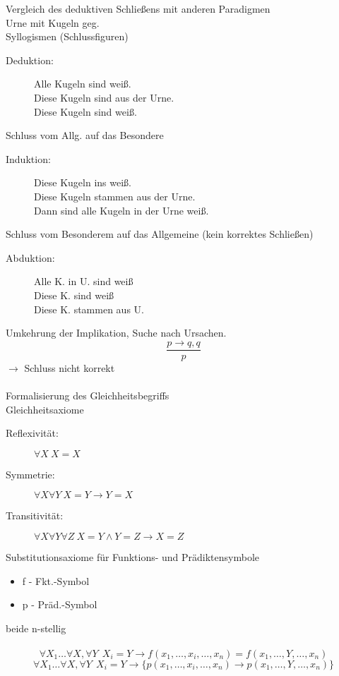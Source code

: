 \documentclass[a4paper,14pt]{article}
\begin{document}
Vergleich des deduktiven Schließens mit anderen Paradigmen\\
Urne mit Kugeln geg.\\
Syllogismen (Schlussfiguren)\\
\begin{description}
 \item[Deduktion:]	Alle Kugeln sind weiß.\\
			Diese Kugeln sind aus der Urne.\\
			Diese Kugeln sind weiß.
\end{description}
Schluss vom Allg. auf das Besondere\\
\begin{description}
 \item[Induktion:]	Diese Kugeln ins weiß.\\
			Diese Kugeln stammen aus der Urne.\\
			Dann sind alle Kugeln in der Urne weiß.\\
\end{description}
Schluss vom Besonderem auf das Allgemeine (kein korrektes Schließen)
\begin{description}
 \item[Abduktion:]	Alle K. in U. sind weiß\\
			Diese K. sind weiß\\
			Diese K. stammen aus U.
\end{description}
Umkehrung der Implikation, Suche nach Ursachen.
$$\frac{p\rightarrow q,q}{p}$$
$\rightarrow$ Schluss nicht korrekt\\
\\
Formalisierung des Gleichheitsbegriffs\\
Gleichheitsaxiome
\begin{description}
 \item[Reflexivität:] $\forall X\: X=X $
 \item[Symmetrie:] $\forall X\forall Y\: X=Y\rightarrow Y=X$
 \item[Transitivität:] $\forall X\forall Y\forall Z\: X=Y\land Y=Z\rightarrow X=Z$
\end{description}
Substitutionsaxiome für Funktions- und Prädiktensymbole
\begin{itemize}
 \item f - Fkt.-Symbol 
 \item p - Präd.-Symbol 
\end{itemize}
beide n-stellig\\
\\
$$\forall X_1 \dots \forall X, \forall Y \:\:X_i=Y\rightarrow f(x_1,\dots,x_i,\dots,x_n)=f(x_1,\dots,Y,\dots,x_n)$$
$$\forall X_1 \dots \forall X, \forall Y \:\:X_i=Y\rightarrow \{p(x_1,\dots,x_i,\dots,x_n)\rightarrow p(x_1,\dots,Y,\dots,x_n)\}$$
\end{document}
